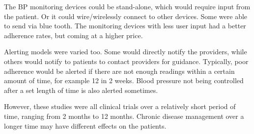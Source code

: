 \documentclass[11pt]{article}
\begin{document}
The BP monitoring devices could be stand-alone, which would require input from the patient. Or it could wire/wirelessly connect to other devices. Some were able to send via blue tooth.  The monitoring devices with less user input had a better adherence rates, but coming at a higher price.  

Alerting models were varied too.  Some would directly notify the providers, while others would notify to patients to contact providers for guidance.  Typically, poor adherence would be alerted if there are not enough readings within a certain amount of time, for example 12 in 2 weeks.  Blood pressure not being controlled after a set length of time is also alerted sometimes.

However, these studies were all clinical trials over a relatively short period of time, ranging from 2 months to 12 months.  Chronic disease management over a longer time may have different effects on the patients.   
\end{document}
